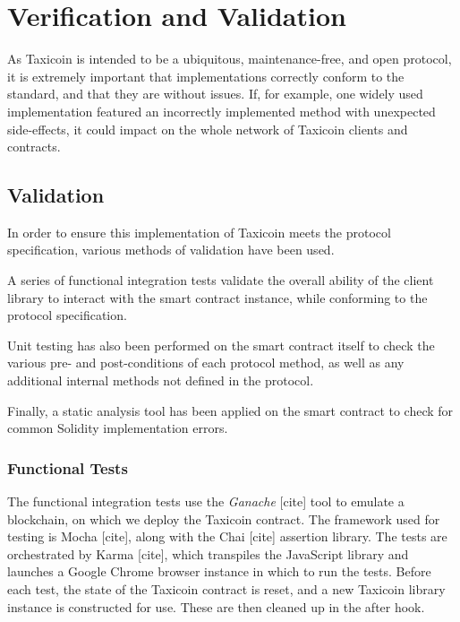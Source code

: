 \section{Verification and Validation}

As Taxicoin is intended to be a ubiquitous, maintenance-free, and open protocol, it is extremely important that implementations correctly conform to the standard, and that they are without issues. If, for example, one widely used implementation featured an incorrectly implemented method with unexpected side-effects, it could impact on the whole network of Taxicoin clients and contracts.

\subsection{Validation}


In order to ensure this implementation of Taxicoin meets the protocol specification, various methods of validation have been used.

A series of functional integration tests validate the overall ability of the client library to interact with the smart contract instance, while conforming to the protocol specification.

Unit testing has also been performed on the smart contract itself to check the various pre- and post-conditions of each protocol method, as well as any additional internal methods not defined in the protocol.

Finally, a static analysis tool has been applied on the smart contract to check for common Solidity implementation errors.

\subsubsection{Functional Tests}


The functional integration tests use the \textit{Ganache} [cite] tool to emulate a blockchain, on which we deploy the Taxicoin contract. The framework used for testing is Mocha [cite], along with the Chai [cite] assertion library. The tests are orchestrated by Karma [cite], which transpiles the JavaScript library and launches a Google Chrome browser instance in which to run the tests. Before each test, the state of the Taxicoin contract is reset, and a new Taxicoin library instance is constructed for use. These are then cleaned up in the after hook.

